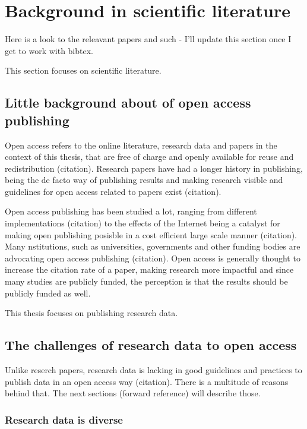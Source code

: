 \chapter{Background in scientific literature}
\label{chapter:background} 

Here is a look to the releavant papers and such - I'll update this section once
I get to work with bibtex.

This section focuses on scientific literature.

\section{Little background about of open access publishing}
\label{sec:benefits_open_publishing}

Open access refers to the online literature, research data and papers in the
context of this thesis, that are free of charge and openly available for reuse
and redistribution (citation). Research papers have had a longer history in
publishing, being the de facto way of publishing results and making research
visible and guidelines for open access related to papers exist (citation).

Open access publishing has been studied a lot, ranging from different
implementations (citation) to the effects of the Internet being a catalyst
for making open publishing posisble in a cost efficient large scale manner
(citation). Many nstitutions, such as universities, governments and other
funding bodies are advocating open access publishing (citation). Open access
is generally thought to increase the citation rate of a paper, making research
more impactful and since many studies are publicly funded, the perception is
that the results should be publicly funded as well.

This thesis focuses on publishing research data.

\section{The challenges of research data to open access}
\label{sec:research_data_oa}

Unlike reserch papers, research data is lacking in good guidelines and
practices to publish data in an open access way (citation). There is a
multitude of reasons behind that. The next sections (forward reference) will
describe those.

\subsection{Research data is diverse}

